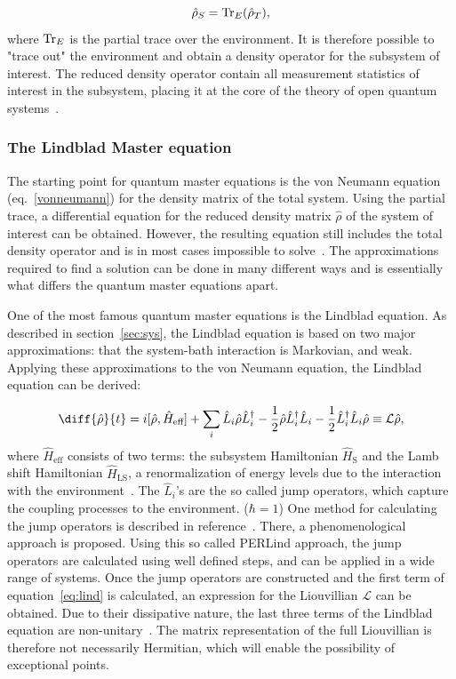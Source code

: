 \documentclass[../main.tex]{subfiles}
\begin{document}
\begin{equation}
    \hat\rho_S = \operatorname{Tr}_E({\hat\rho_T}),
\end{equation}
where $\operatorname{Tr}_E$ is the partial trace over the environment. It is therefore possible to "trace out" the environment and obtain a density operator for the subsystem of interest. The reduced density operator contain all measurement statistics of interest in the subsystem, placing it at the core of the theory of open quantum systems~\cite{bookopen}.


\subsubsection{The Lindblad Master equation}\label{sec:lind}
The starting point for quantum master equations is the von Neumann equation (eq.~\eqref{vonneumann}) for the density matrix of the total system. Using the partial trace, a differential equation for the reduced density matrix $\hat\rho$ of the system of interest can be obtained. However, the resulting equation still includes the total density operator and is in most cases impossible to solve~\cite{lindblad}. The approximations required to find a solution can be done in many different ways and is essentially what differs the quantum master equations apart.

One of the most famous quantum master equations is the Lindblad equation. As described in section~\ref{sec:sys}, the Lindblad equation is based on two major approximations: that the system-bath interaction is Markovian, and weak. Applying these approximations to the von Neumann equation, the Lindblad equation can be derived:

\begin{equation}\label{eq:lind}
    \diff{\hat\rho}{t} = i[\hat\rho, \hat H_\text{eff}] + \sum_i \hat L_i\hat\rho\hat L_i^\dag - \frac{1}{2}\hat\rho\hat L_i^\dag\hat L_i - \frac{1}{2}\hat L_i^\dag\hat L_i \hat\rho \equiv \mathcal{L}\hat\rho,
\end{equation}
where $\hat H_\text{eff}$ consists of two terms: the subsystem Hamiltonian $\hat H_\text{S}$ and the Lamb shift Hamiltonian $\hat H_\text{LS}$, a renormalization of energy levels due to the interaction with the environment~\cite{lindblad}. The $\hat L_i$'s are the so called jump operators, which capture the coupling processes to the environment. ($\hbar=1$) One method for calculating the jump operators is described in reference~\cite{perlind}. There, a phenomenological approach is proposed. Using this so called PERLind approach, the jump operators are calculated using well defined steps, and can be applied in a wide range of systems. Once the jump operators are constructed and the first term of equation~\eqref{eq:lind} is calculated, an expression for the Liouvillian $\mathcal{L}$ can be obtained. Due to their dissipative nature, the last three terms of the Lindblad equation are non-unitary~\cite{bookopen}. The matrix representation of the full Liouvillian is therefore not necessarily Hermitian, which will enable the possibility of exceptional points.
\end{document}
